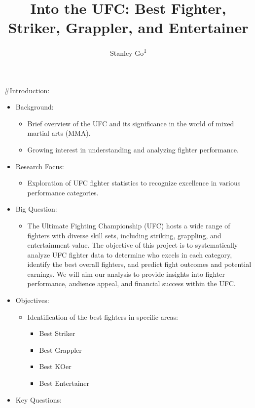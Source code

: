 \documentclass[
  man,floatsintext]{apa6}
\title{Into the UFC: Best Fighter, Striker, Grappler, and Entertainer}
\author{Stanley Go\textsuperscript{1}}
\date{}
\affiliation{\vspace{0.5cm}\textsuperscript{1} Rutgers University}
\providecommand{\tightlist}{%
  \setlength{\itemsep}{0pt}\setlength{\parskip}{0pt}}
\begin{document}
\maketitle

\#Introduction:

\begin{itemize}
\tightlist
\item
  Background:

  \begin{itemize}
  \tightlist
  \item
    Brief overview of the UFC and its significance in the world of mixed martial arts (MMA).
  \item
    Growing interest in understanding and analyzing fighter performance.
  \end{itemize}
\item
  Research Focus:

  \begin{itemize}
  \tightlist
  \item
    Exploration of UFC fighter statistics to recognize excellence in various performance categories.
  \end{itemize}
\item
  Big Question:

  \begin{itemize}
  \tightlist
  \item
    The Ultimate Fighting Championship (UFC) hosts a wide range of fighters with diverse skill sets, including striking, grappling, and entertainment value. The objective of this project is to systematically analyze UFC fighter data to determine who excels in each category, identify the best overall fighters, and predict fight outcomes and potential earnings. We will aim our analysis to provide insights into fighter performance, audience appeal, and financial success within the UFC.
  \end{itemize}
\item
  Objectives:

  \begin{itemize}
  \tightlist
  \item
    Identification of the best fighters in specific areas:

    \begin{itemize}
    \tightlist
    \item
      Best Striker
    \item
      Best Grappler
    \item
      Best KOer
    \item
      Best Entertainer
    \end{itemize}
  \end{itemize}
\item
  Key Questions:


\end{itemize}
\end{document}
